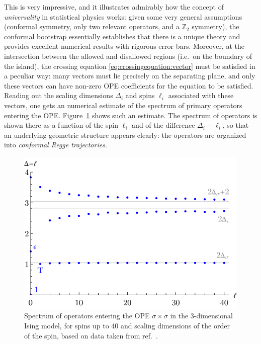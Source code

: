\documentclass[a4paper,12pt]{article}
\numberwithin{equation}{section}
\begin{document}
This is very impressive, and it illustrates admirably how the concept of \emph{universality} in statistical physics works: given some very general assumptions 
(conformal symmetry, only two relevant operators, and a $\mathbb{Z}_2$ symmetry), the conformal bootstrap essentially establishes that there is a unique theory and provides excellent numerical results with rigorous error bars. Moreover, at the intersection between the allowed and disallowed regions (i.e.~on the boundary of the island), the crossing equation \eqref{eq:crossingequation:vector} must be satisfied in a peculiar way: many vectors must lie precisely on the separating plane, and only these vectors can have non-zero OPE coefficients for the equation to be satisfied. Reading out the scaling dimensions $\Delta_i$ and spins $\ell_i$ associated with these vectors, one gets an numerical estimate of the spectrum of primary operators entering the OPE. Figure~\ref{fig:Ising:spectrum} shows such an estimate. The spectrum of operators is shown there as a function of the spin $\ell_i$ and of the difference $\Delta_i - \ell_i$, so that an underlying geometric structure appears clearly: the operators are organized into \emph{conformal Regge trajectories}. 
%
\begin{figure}
	\centering
	\includegraphics[width=0.8\linewidth]{figures/IsingSpectrum.pdf}
	\caption{Spectrum of operators entering the OPE
	$\sigma \times \sigma$ in the 3-dimensional Ising model,
	for spins up to 40
	and scaling dimensions of the order of the spin, 
	based on data taken from ref.~\cite{Simmons-Duffin:2016wlq}.}
	\label{fig:Ising:spectrum}
\end{figure}
\end{document}
